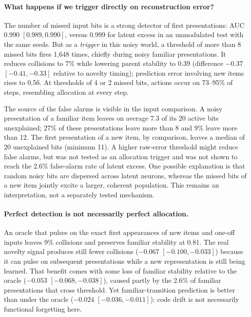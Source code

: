 \documentclass[11pt,a4paper]{article}
\begin{document}
\paragraph{What happens if we trigger directly on reconstruction error?}
The number of missed input bits is a strong detector of first presentations: AUC 0.990 $[0.989,0.990]$, versus 0.999 for latent excess in an unmodulated test with the same seeds. But as a \emph{trigger} in this noisy world, a threshold of more than 8 missed bits fires 1{,}648 times, chiefly during noisy familiar presentations. It reduces collisions to 7\% while lowering parent stability to 0.39 (difference $-0.37$ $[-0.41,-0.33]$ relative to novelty timing); prediction error involving new items rises to 0.56. At thresholds of 4 or 2 missed bits, actions occur on 73--95\% of steps, resembling allocation at every step.

The source of the false alarms is visible in the input comparison. A noisy presentation of a familiar item leaves on average 7.3 of its 20 active bits unexplained; 27\% of these presentations leave more than 8 and 9\% leave more than 12. The first presentation of a new item, by comparison, leaves a median of 20 unexplained bits (minimum 11). A higher raw-error threshold might reduce false alarms, but was not tested as an allocation trigger and was not shown to reach the 2.6\% false-alarm rate of latent excess. One possible explanation is that random noisy bits are dispersed across latent neurons, whereas the missed bits of a new item jointly excite a larger, coherent population. This remains an interpretation, not a separately tested mechanism.

\paragraph{Perfect detection is not necessarily perfect allocation.}
An oracle that pulses on the exact first appearances of new items and one-off inputs leaves 9\% collisions and preserves familiar stability at 0.81. The real novelty signal produces still fewer collisions ($-0.067$ $[-0.100,-0.033]$) because it can pulse on subsequent presentations while a new representation is still being learned. That benefit comes with some loss of familiar stability relative to the oracle ($-0.053$ $[-0.068,-0.038]$), caused partly by the 2.6\% of familiar presentations that cross threshold. Yet familiar-transition prediction is better than under the oracle ($-0.024$ $[-0.036,-0.011]$): code drift is not necessarily functional forgetting here.
\end{document}
